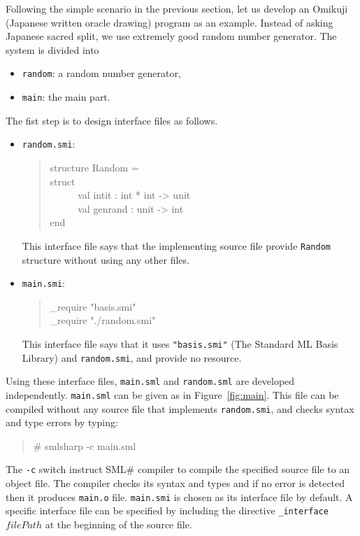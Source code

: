 \documentclass{jbook}
\newcommand{\smlsharp}{SML\#}
\newenvironment{program}{\begin{tt}\begin{quote}}{\end{quote}\end{tt}}
\newcommand{\myem}{\ \ \ \ \  }
\begin{document}
\else%
	Following the simple scenario in the previous section, let us
develop an Omikuji (Japanese written oracle drawing) program as an example.
	Instead of asking Japanese sacred split, we use extremely good
random number generator.
	The system is divided into
\begin{itemize}
\item {\tt random}: a random number generator,
\item {\tt main}: the main part.
\end{itemize}
	The fist step is to design interface files as follows.
\begin{itemize}
\item {\tt random.smi}:
\begin{program}
structure Random =
\\
struct
\\\myem
  val intit : int * int -> unit
\\\myem
  val genrand : unit -> int
\\
end
\end{program}
	This interface file says that the implementing source file provide
{\tt Random} structure without using any other files.
\item {\tt main.smi}:
\begin{program}
\_require "basis.smi"\\
\_require "./random.smi"
\end{program}
	This interface file says that it uses  {\tt "basis.smi"} (The
Standard ML Basis Library) and {\tt random.smi}, and provide no resource.
\end{itemize}

	Using these interface files, {\tt main.sml} and {\tt random.sml}
are developed independently.
	{\tt main.sml} can be given as in Figure~\ref{fig:main}.
	This file can be compiled without any source file that implements
{\tt random.smi}, and checks syntax and type errors by typing:
\begin{program}
\# smlsharp -c main.sml
\end{program}
	The {\tt -c} switch instruct \smlsharp{} compiler
to compile the specified source file to an object file.
	The compiler checks its syntax and types and if no error is
detected then it produces {\tt main.o} file.
	{\tt main.smi} is chosen as its interface file by default.
	A specific interface file can be specified by including the
directive {\tt \_interface $filePath$} at the beginning of the source
file.
\end{document}
